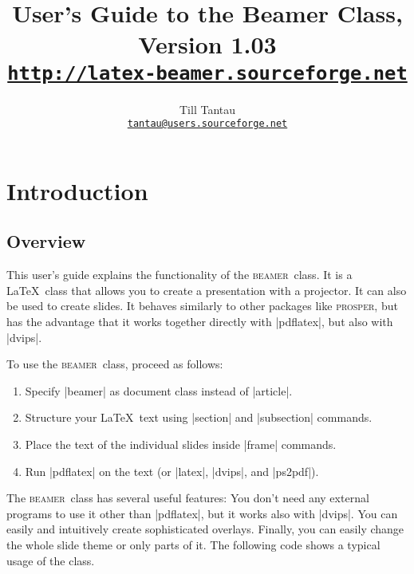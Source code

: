 \documentclass{ltxdoc}
\def\beamer{\textsc{beamer}}
\begin{document}
\title{User's Guide to the Beamer Class, Version 1.03\\
\Large\href{http://latex-beamer.sourceforge.net}{\texttt{http://latex-beamer.sourceforge.net}}}
\author{Till Tantau\\
  \href{mailto:tantau@users.sourceforge.net}{\texttt{tantau@users.sourceforge.net}}}

\maketitle

\tableofcontents

\section{Introduction}

\subsection{Overview}

This user's guide explains the functionality of the \beamer\ class.
It is a \LaTeX\ class that allows you to create a presentation with a
projector. It can also be used to create slides. It behaves 
similarly to other packages like \textsc{prosper}, but has the
advantage that it works together directly with |pdflatex|, but
also with |dvips|.

To use the \beamer\ class, proceed as follows:
\begin{enumerate}
\item
  Specify |beamer| as document class instead of
  |article|.
\item
  Structure your \LaTeX\ text using |section| and
  |subsection| commands.
\item
  Place the text of the individual slides inside |frame|
  commands.
\item
  Run |pdflatex| on the text (or |latex|,
  |dvips|, and |ps2pdf|).
\end{enumerate}

The \beamer\ class has several useful features: You don't need any
external programs to use it other than |pdflatex|, but it works
also with |dvips|. You can easily and intuitively create
sophisticated overlays. Finally, you can easily change the whole slide
theme or only parts of it. The following code shows a typical usage of
the class.
\end{document}

